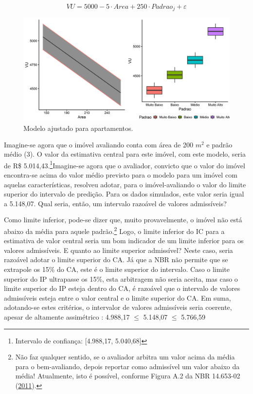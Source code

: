 \documentclass[
  a4paper, 11pt]{article}
\begin{document}
\begin{equation} \label{eq:ex5}
VU = 5000 - 5 \cdot Area + 250 \cdot Padrao_j + \varepsilon
\end{equation}

\begin{figure}[H]

{\centering \includegraphics[width=0.7\linewidth]{images/modelo-1} 

}

\caption{Modelo ajustado para apartamentos.}\label{fig:modelo}
\end{figure}

Imagine-se agora que o imóvel avaliando conta com área de 200 \(m^2\) e
padrão médio (3). O valor da estimativa central para este imóvel, com
este modelo, seria de R\$ 5.014,43.\footnote{Intervalo de confiança:
  {[}4.988,17, 5.040,68{]}}Imagine-se agora que o avaliador, convicto
que o valor do imóvel encontra-se acima do valor médio previsto para o
modelo para um imóvel com aquelas características, resolveu adotar, para
o imóvel-avaliando o valor do limite superior do intervalo de predição.
Para os dados simulados, este valor seria igual a 5.148,07. Qual seria,
então, um intervalo razoável de valores admissíveis?

Como limite inferior, pode-se dizer que, muito provavelmente, o imóvel
não está abaixo da média para aquele padrão.\footnote{Não faz qualquer
  sentido, se o avaliador arbitra um valor acima da média para o
  bem-avaliando, depois reportar como admissível um valor abaixo da
  média! Atualmente, isto é possível, conforme Figura A.2 da NBR
  14.653-02 (\protect\hyperlink{ref-NBR1465302}{2011}).} Logo, o limite
inferior do IC para a estimativa de valor central seria um bom indicador
de um limite inferior para os valores admissíveis. E quanto ao limite
superior admissível? Neste caso, seria razoável adotar o limite superior
do CA. Já que a NBR não permite que se extrapole os 15\% do CA, este é o
limite superior do intervalo. Caso o limite superior do IP ultrapasse os
15\%, esta arbitragem não seria aceita, mas caso o limite superior do IP
esteja dentro do CA, é razoável que o intervalo de valores admissíveis
esteja entre o valor central e o limite superior do CA. Em suma,
adotando-se estes critérios, o intervalor de valores admissíveis seria
coerente, apesar de altamente assimétrico : 4.988,17 \(\leq\) 5.148,07
\(\leq\) 5.766,59
\end{document}
